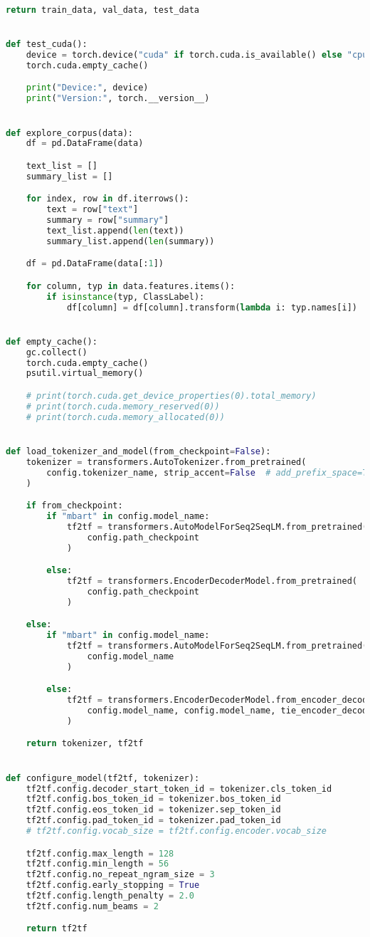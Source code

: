 \begin{lstlisting}[language=Python, caption=Hilfsmethoden]
    return train_data, val_data, test_data


def test_cuda():
    device = torch.device("cuda" if torch.cuda.is_available() else "cpu")
    torch.cuda.empty_cache()

    print("Device:", device)
    print("Version:", torch.__version__)


def explore_corpus(data):
    df = pd.DataFrame(data)

    text_list = []
    summary_list = []

    for index, row in df.iterrows():
        text = row["text"]
        summary = row["summary"]
        text_list.append(len(text))
        summary_list.append(len(summary))

    df = pd.DataFrame(data[:1])

    for column, typ in data.features.items():
        if isinstance(typ, ClassLabel):
            df[column] = df[column].transform(lambda i: typ.names[i])


def empty_cache():
    gc.collect()
    torch.cuda.empty_cache()
    psutil.virtual_memory()

    # print(torch.cuda.get_device_properties(0).total_memory)
    # print(torch.cuda.memory_reserved(0))
    # print(torch.cuda.memory_allocated(0))


def load_tokenizer_and_model(from_checkpoint=False):
    tokenizer = transformers.AutoTokenizer.from_pretrained(
        config.tokenizer_name, strip_accent=False  # add_prefix_space=True
    )

    if from_checkpoint:
        if "mbart" in config.model_name:
            tf2tf = transformers.AutoModelForSeq2SeqLM.from_pretrained(
                config.path_checkpoint
            )

        else:
            tf2tf = transformers.EncoderDecoderModel.from_pretrained(
                config.path_checkpoint
            )

    else:
        if "mbart" in config.model_name:
            tf2tf = transformers.AutoModelForSeq2SeqLM.from_pretrained(
                config.model_name
            )

        else:
            tf2tf = transformers.EncoderDecoderModel.from_encoder_decoder_pretrained(
                config.model_name, config.model_name, tie_encoder_decoder=True
            )

    return tokenizer, tf2tf


def configure_model(tf2tf, tokenizer):
    tf2tf.config.decoder_start_token_id = tokenizer.cls_token_id
    tf2tf.config.bos_token_id = tokenizer.bos_token_id
    tf2tf.config.eos_token_id = tokenizer.sep_token_id
    tf2tf.config.pad_token_id = tokenizer.pad_token_id
    # tf2tf.config.vocab_size = tf2tf.config.encoder.vocab_size

    tf2tf.config.max_length = 128
    tf2tf.config.min_length = 56
    tf2tf.config.no_repeat_ngram_size = 3
    tf2tf.config.early_stopping = True
    tf2tf.config.length_penalty = 2.0
    tf2tf.config.num_beams = 2

    return tf2tf
\end{lstlisting}
\newpage


